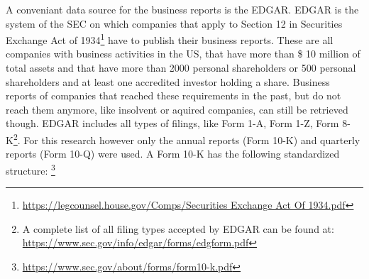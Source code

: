 A conveniant data source for the business reports is the \ac{EDGAR}.
\ac{EDGAR} is the system of the \ac{SEC} on which companies that apply to Section 12 in Securities Exchange Act of 1934\footnote{\url{https://legcounsel.house.gov/Comps/Securities Exchange Act Of 1934.pdf}} have to publish their business reports.
These are all companies with business activities in the US, that have more than \$ 10 million of total assets and that have more than 2000 personal shareholders or 500 personal shareholders and at least one accredited investor holding a share.
Business reports of companies that reached these requirements in the past, but do not reach them anymore, like insolvent or aquired companies, can still be retrieved though.
\ac{EDGAR} includes all types of filings, like Form 1-A, Form 1-Z, Form 8-K\footnote{A complete list of all filing types accepted by \ac{EDGAR} can be found at: \url{https://www.sec.gov/info/edgar/forms/edgform.pdf}}.
For this research however only the annual reports (Form 10-K) and quarterly reports (Form 10-Q) were used.
A Form 10-K has the following standardized structure: \footnote{\url{https://www.sec.gov/about/forms/form10-k.pdf}}
